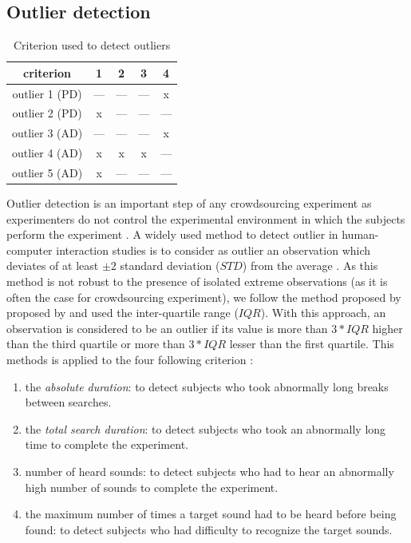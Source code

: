 \documentclass{aes2e}
\begin{document}
\subsection{Outlier detection}

\begin{table}[t]
\caption{\label{tab1} Criterion used to detect outliers}
\begin{center}
\begin{tabular}{ccccc}
criterion      &  1  &  2  &  3  &  4  \\
\hline
outlier 1 (PD) & --- & --- & --- &  x  \\
outlier 2 (PD) &  x  & --- & --- & --- \\  
outlier 3 (AD) & --- & --- & --- &  x \\
outlier 4 (AD) &  x  &  x  &  x  & --- \\
outlier 5 (AD) &  x  & --- & --- & --- \\
\hline
\end{tabular}
\end{center}
\end{table} 

Outlier detection is an important step of any crowdsourcing experiment as experimenters do not control the experimental environment in which the subjects perform the experiment \cite{komarov2013crowdsourcing}\cite{buchholz2011crowdsourcing}. A widely used method to detect outlier in  human-computer interaction studies is to consider as outlier an observation  which deviates of at least $\pm2$ standard deviation ($STD$) from the average \cite{komarov2013crowdsourcing}. As this method is not robust to the presence of isolated extreme observations (as it is often the case for crowdsourcing experiment), we follow the  method proposed by proposed by \cite{komarov2013crowdsourcing} and used the inter-quartile range ($IQR$). With this approach, an observation is considered to be an outlier if its value is more than $3*IQR$ higher than the third quartile or more than $3*IQR$ lesser than the first quartile. This methods is applied to the four following criterion :

\begin{enumerate}
\item the \textit{absolute duration}: to detect subjects who took abnormally long breaks between searches.
\item the \textit{total search duration}: to detect subjects who took an abnormally long time to complete the experiment.
\item number of heard sounds: to detect subjects who had to hear an abnormally high number of sounds to complete the experiment.
\item the maximum number of times a target sound had to be heard before being found: to detect subjects who had difficulty to recognize the target sounds.
\end{enumerate}
\end{document}

